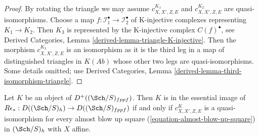 \begin{proof}
By rotating the triangle we may assume $c^{K_1}_{X, X', Z, E}$ and
$c^{K_2}_{X, X', Z, E}$ are quasi-isomorphisms. Choose a map
$f : \mathcal{I}^\bullet_1 \to \mathcal{I}^\bullet_2$ of
K-injective complexes representing $K_1 \to K_2$.
Then $K_3$ is represented by the K-injective complex
$C(f)^\bullet$, see
Derived Categories, Lemma \ref{derived-lemma-triangle-K-injective}.
Then the morphism $c^{K_3}_{X, X', Z, E}$ is an isomorphism
as it is the third leg in a map of distinguished triangles
in $K(\textit{Ab})$ whose other two legs are quasi-isomorphisms.
Some details omitted; use
Derived Categories, Lemma \ref{derived-lemma-third-isomorphism-triangle}.
\end{proof}

\begin{proposition}
\label{proposition-check-h}
Let $K$ be an object of $D^+((\Sch/S)_{fppf})$.
Then $K$ is in the essential image of
$R\epsilon_* : D((\Sch/S)_h) \to D((\Sch/S)_{fppf})$
if and only if $c^K_{X, X', Z, E}$ is a quasi-isomorphism
for every almost blow up square (\ref{equation-almost-blow-up-square})
in $(\Sch/S)_h$ with $X$ affine.
\end{proposition}

